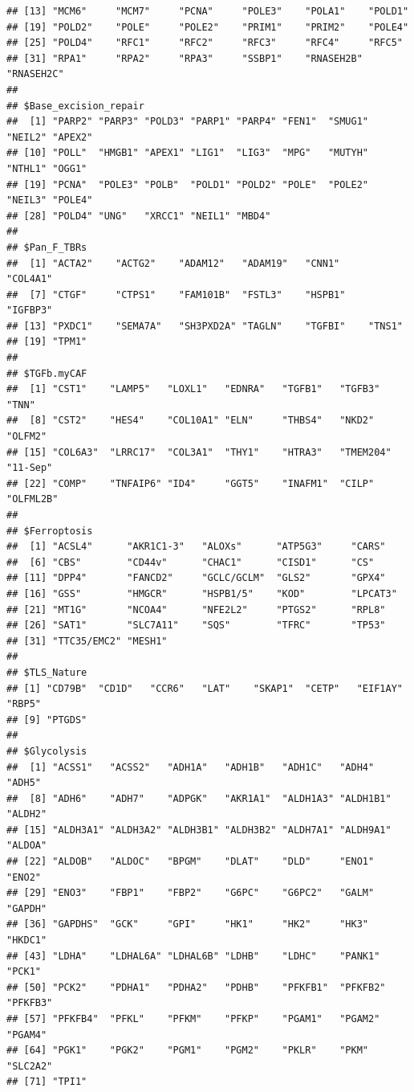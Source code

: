 \documentclass[
  12pt,
]{book}
\theoremstyle{definition}
\theoremstyle{definition}
\theoremstyle{definition}
\theoremstyle{definition}
\theoremstyle{remark}
\begin{document}
\begin{verbatim}
## [13] "MCM6"     "MCM7"     "PCNA"     "POLE3"    "POLA1"    "POLD1"   
## [19] "POLD2"    "POLE"     "POLE2"    "PRIM1"    "PRIM2"    "POLE4"   
## [25] "POLD4"    "RFC1"     "RFC2"     "RFC3"     "RFC4"     "RFC5"    
## [31] "RPA1"     "RPA2"     "RPA3"     "SSBP1"    "RNASEH2B" "RNASEH2C"
## 
## $Base_excision_repair
##  [1] "PARP2" "PARP3" "POLD3" "PARP1" "PARP4" "FEN1"  "SMUG1" "NEIL2" "APEX2"
## [10] "POLL"  "HMGB1" "APEX1" "LIG1"  "LIG3"  "MPG"   "MUTYH" "NTHL1" "OGG1" 
## [19] "PCNA"  "POLE3" "POLB"  "POLD1" "POLD2" "POLE"  "POLE2" "NEIL3" "POLE4"
## [28] "POLD4" "UNG"   "XRCC1" "NEIL1" "MBD4" 
## 
## $Pan_F_TBRs
##  [1] "ACTA2"    "ACTG2"    "ADAM12"   "ADAM19"   "CNN1"     "COL4A1"  
##  [7] "CTGF"     "CTPS1"    "FAM101B"  "FSTL3"    "HSPB1"    "IGFBP3"  
## [13] "PXDC1"    "SEMA7A"   "SH3PXD2A" "TAGLN"    "TGFBI"    "TNS1"    
## [19] "TPM1"    
## 
## $TGFb.myCAF
##  [1] "CST1"    "LAMP5"   "LOXL1"   "EDNRA"   "TGFB1"   "TGFB3"   "TNN"    
##  [8] "CST2"    "HES4"    "COL10A1" "ELN"     "THBS4"   "NKD2"    "OLFM2"  
## [15] "COL6A3"  "LRRC17"  "COL3A1"  "THY1"    "HTRA3"   "TMEM204" "11-Sep" 
## [22] "COMP"    "TNFAIP6" "ID4"     "GGT5"    "INAFM1"  "CILP"    "OLFML2B"
## 
## $Ferroptosis
##  [1] "ACSL4"      "AKR1C1-3"   "ALOXs"      "ATP5G3"     "CARS"      
##  [6] "CBS"        "CD44v"      "CHAC1"      "CISD1"      "CS"        
## [11] "DPP4"       "FANCD2"     "GCLC/GCLM"  "GLS2"       "GPX4"      
## [16] "GSS"        "HMGCR"      "HSPB1/5"    "KOD"        "LPCAT3"    
## [21] "MT1G"       "NCOA4"      "NFE2L2"     "PTGS2"      "RPL8"      
## [26] "SAT1"       "SLC7A11"    "SQS"        "TFRC"       "TP53"      
## [31] "TTC35/EMC2" "MESH1"     
## 
## $TLS_Nature
## [1] "CD79B"  "CD1D"   "CCR6"   "LAT"    "SKAP1"  "CETP"   "EIF1AY" "RBP5"  
## [9] "PTGDS" 
## 
## $Glycolysis
##  [1] "ACSS1"   "ACSS2"   "ADH1A"   "ADH1B"   "ADH1C"   "ADH4"    "ADH5"   
##  [8] "ADH6"    "ADH7"    "ADPGK"   "AKR1A1"  "ALDH1A3" "ALDH1B1" "ALDH2"  
## [15] "ALDH3A1" "ALDH3A2" "ALDH3B1" "ALDH3B2" "ALDH7A1" "ALDH9A1" "ALDOA"  
## [22] "ALDOB"   "ALDOC"   "BPGM"    "DLAT"    "DLD"     "ENO1"    "ENO2"   
## [29] "ENO3"    "FBP1"    "FBP2"    "G6PC"    "G6PC2"   "GALM"    "GAPDH"  
## [36] "GAPDHS"  "GCK"     "GPI"     "HK1"     "HK2"     "HK3"     "HKDC1"  
## [43] "LDHA"    "LDHAL6A" "LDHAL6B" "LDHB"    "LDHC"    "PANK1"   "PCK1"   
## [50] "PCK2"    "PDHA1"   "PDHA2"   "PDHB"    "PFKFB1"  "PFKFB2"  "PFKFB3" 
## [57] "PFKFB4"  "PFKL"    "PFKM"    "PFKP"    "PGAM1"   "PGAM2"   "PGAM4"  
## [64] "PGK1"    "PGK2"    "PGM1"    "PGM2"    "PKLR"    "PKM"     "SLC2A2" 
## [71] "TPI1"
\end{verbatim}
\end{document}
